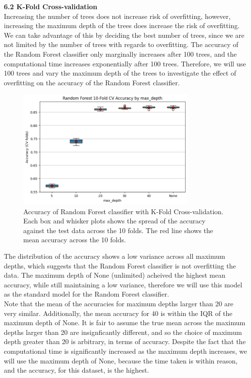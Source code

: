 \documentclass[12pt]{article}
\begin{document}
\vspace{20pt}

\textbf{6.2 K-Fold Cross-validation}
\\
Increasing the number of trees does not increase risk of overfitting, however, increasing the maximum depth of the trees does increase the risk of overfitting. We can take advantage of this by deciding the best number of trees, since we are not limited by the number of trees with regards to overfitting. The accuracy of the Random Forest classifier only marginally increases after 100 trees, and the computational time increases exponentially after 100 trees. Therefore, we will use 100 trees and vary the maximum depth of the trees to investigate the effect of overfitting on the accuracy of the Random Forest classifier.

\begin{figure}[H]
\centering
\includegraphics[width=0.8\textwidth]{figures/rf_accuracy_kfold.png}
\caption{Accuracy of Random Forest classifier with K-Fold Cross-validation. Each box and whisker plots shows the spread of the accuracy against the test data across the 10 folds. The red line shows the mean accuracy across the 10 folds.}
\label{fig:rf_accuracy_kfold}
\end{figure}

The distribution of the accuracy shows a low variance across all maximum depths, which suggests that the Random Forest classifier is not overfitting the data. The maximum depth of None (unlimited) acheived the highest mean accuracy, while still maintaining a low variance, therefore we will use this model as the standard model for the Random Forest classifier. 
\\
Note that the mean of the accuracies for maximum depths larger than 20 are very similar. Additionally, the mean accuracy for 40 is within the IQR of the maximum depth of None. It is fair to assume the true mean across the maximum depths larger than 20 are insignficantly different, and so the choice of maximum depth greater than 20 is arbitrary, in terms of accuracy. Despite the fact that the computational time is significantly increased as the maximum depth increases, we will use the maximum depth of None, because the time taken is within reason, and the accuracy, for this dataset, is the highest.
\end{document}
